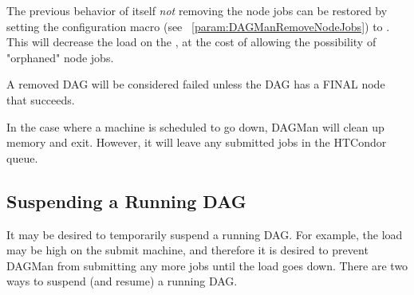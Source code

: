 The previous behavior of  itself \emph{not} removing
the node jobs can be restored by setting the
 configuration macro
(see ~\ref{param:DAGManRemoveNodeJobs})
to .  This will decrease the load on the ,
at the cost of allowing the possibility of "orphaned" node jobs.

A removed DAG will be considered failed unless the
DAG has a FINAL node that succeeds.

In the case where a
machine is scheduled to go down,
DAGMan will clean up memory and exit.
However, it will leave any submitted jobs
in the HTCondor queue.

\subsection{\label{sec:DagSuspend}Suspending a Running DAG}

It may be desired to temporarily suspend a running DAG.
For example, the load may be high on the submit machine,
and therefore it is desired to prevent DAGMan from
submitting any more jobs until the load goes down.
There are two ways to suspend (and resume) a running DAG.

